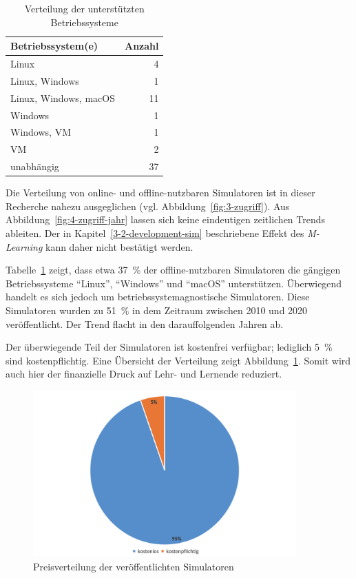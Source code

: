 \begin{table}[h]
	\centering
	\caption{Verteilung der unterstützten Betriebssysteme}
	\label{tab:os}
	\begin{tabular}{l r}
		\toprule
		\textbf{Betriebssystem(e)} & \textbf{Anzahl} \\
		\midrule
		Linux                     & 4  \\
		Linux, Windows            & 1  \\
		Linux, Windows, macOS     & 11 \\
		Windows                   & 1  \\
		Windows, \ac{VM}          & 1  \\
		\ac{VM}                   & 2  \\
		unabhängig                & 37 \\
		\bottomrule
	\end{tabular}
\end{table}

Die Verteilung von online- und offline-nutzbaren Simulatoren ist in dieser Recherche nahezu ausgeglichen (vgl. Abbildung~\ref{fig:3-zugriff}). Aus Abbildung~\ref{fig:4-zugriff-jahr} lassen sich keine eindeutigen zeitlichen Trends ableiten. Der in Kapitel~\ref{3-2-development-sim} beschriebene Effekt des \textit{M-Learning} kann daher nicht bestätigt werden.

Tabelle~\ref{tab:os} zeigt, dass etwa 37~\% der offline-nutzbaren Simulatoren die gängigen Betriebssysteme \enquote{Linux}, \enquote{Windows} und \enquote{macOS} unterstützen. Überwiegend handelt es sich jedoch um betriebssystemagnostische Simulatoren. Diese Simulatoren wurden zu 51~\% in dem Zeitraum zwischen 2010 und 2020 veröffentlicht. Der Trend flacht in den darauffolgenden Jahren ab.

Der überwiegende Teil der Simulatoren ist kostenfrei verfügbar; lediglich 5~\% sind kostenpflichtig. Eine Übersicht der Verteilung zeigt Abbildung~\ref{fig:9-preis}. Somit wird auch hier der finanzielle Druck auf Lehr- und Lernende reduziert.

\begin{figure}[!htbp]
    \centering
    \includegraphics[width=0.90\textwidth]{graphics_sim/9-preis.png}
    \caption{Preisverteilung der veröffentlichten Simulatoren}
    \label{fig:9-preis}
\end{figure}

